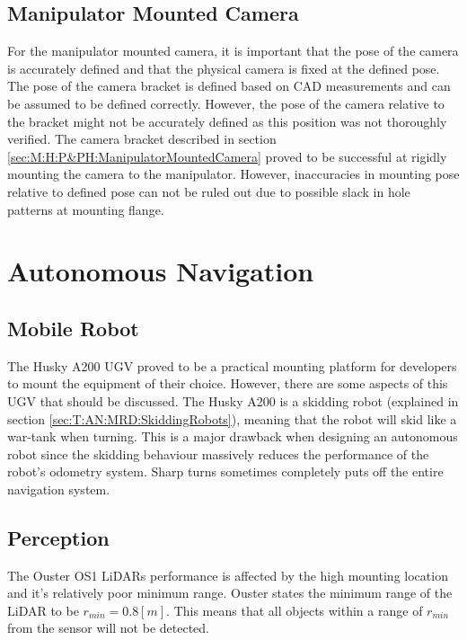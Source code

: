 \subsection{Manipulator Mounted Camera}\label{D:H:ManipulatorMountedCamera}
For the manipulator mounted camera, it is important that the pose of the camera is accurately defined and that the physical camera is fixed at the defined pose. The pose of the camera bracket is defined based on CAD measurements and can be assumed to be defined correctly. However, the pose of the camera relative to the bracket might not be accurately defined as this position was not thoroughly verified. 
The camera bracket described in section \ref{sec:M:H:P&PH:ManipulatorMountedCamera} proved to be successful at rigidly mounting the camera to the manipulator. However, inaccuracies in mounting pose relative to defined pose can not be ruled out due to possible slack in hole patterns at mounting flange.

\section{Autonomous Navigation} \label{sec:D:AutonomousNavigaion}

\subsection{Mobile Robot} \label{sec:D:AN:MobileRobot}
The Husky A200 UGV proved to be a practical mounting platform for developers to mount the equipment of their choice. However, there are some aspects of this UGV that should be discussed. The Husky A200 is a skidding robot (explained in section \ref{sec:T:AN:MRD:SkiddingRobots}), meaning that the robot will skid like a war-tank when turning. This is a major drawback when designing an autonomous robot since the skidding behaviour massively reduces the performance of the robot's odometry system. Sharp turns sometimes completely puts off the entire navigation system. 

\subsection{Perception} \label{sec:D:AN:Perception}
The Ouster OS1 LiDARs performance is affected by the high mounting location and it's relatively poor minimum range. Ouster states the minimum range of the LiDAR to be $r_{min}=0.8[m]$. This means that all objects within a range of $r_{min}$ from the sensor will not be detected.

